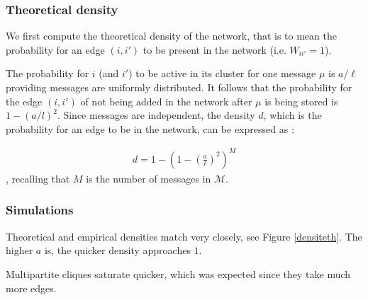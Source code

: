 \documentclass[english,10pt,twocolumn]{IEEEtran}
\theoremstyle{definition}
\begin{document}
	\subsubsection{Theoretical density}
	
	We first compute the theoretical density of the network, that is to mean the probability for an edge $(i, i')$ to be present in the network (i.e. $W_{ii'} = 1$). 
	
	
	
	
	
	
	
	
	

	
	
	The probability for $i$ (and $i'$) to be active in its cluster for one message $\mu$ is $a/\ell$ providing messages are uniformly distributed. It follows that the probability for the edge $(i,i')$ of not being added in the network after $\mu$ is being stored is $1 - \left(a/l\right)^2$. Since messages are independent, the density $d$, which is the probability for an edge to be in the network, can be expressed as :
	
	\begin{align}
		\label{formula_density}
		d = 1 - \left( 1 - \left(\frac{a}{\ell}\right)^2 \right)^M 
	\end{align}		
	, recalling that $M$ is the number of messages in $\mathcal{M}$.	
	
	\subsubsection{Simulations}
	
	Theoretical and empirical densities match very closely, see Figure \ref{densiteth}. %
	The higher $a$ is, the quicker density approaches $1$.
	
	Multipartite cliques saturate quicker, which was expected since they take much more edges.
	
\end{document}
